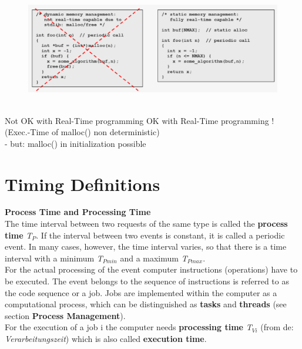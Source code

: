 	\begin{figure}[h]
    \centering
    \includegraphics[width=15cm, height=5cm]{Images/image74.png}
    \label{fig:Fig }
    \end{figure}
    
Not OK with Real-Time programming   \hspace{3cm}  OK with Real-Time programming !\\
(Exec.-Time of malloc() non deterministic)\\
- but: malloc() in initialization possible  

\section{Timing Definitions}

{\rot\bf Process Time and Processing Time}\\

The time interval between two requests of the same type is called the \textbf{process time} \textit{T${}_{P}$}. If the interval between two events is constant, it is called a periodic event. In many cases, however, the time interval varies, so that there is a time interval with a minimum \textit{T${}_{Pmin}$} and a maximum \textit{T${}_{Pmax}$}.\\

For the actual processing of the event computer instructions (operations) have to be executed. The event belongs to the sequence of instructions is referred to as the code sequence or a job. Jobs are implemented within the computer as a computational process, which can be distinguished as \textbf{tasks} and \textbf{threads} (see section \textbf{Process Management}). \\

For the execution of a job i the computer needs \textbf{processing time} \textit{T${}_{Vi}$} (from de: \textit{Verarbeitungszeit}) which is also called \textbf{execution time}.\\


